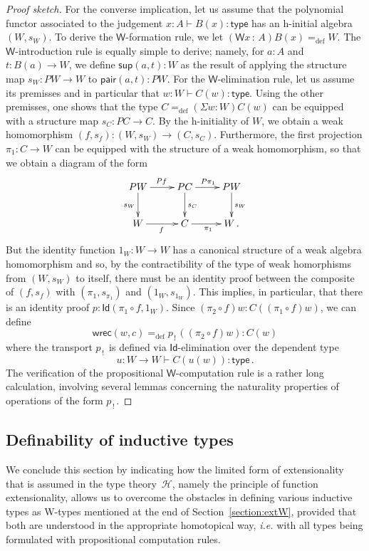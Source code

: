\documentclass{article}
\newcommand{\defeq}{=_{\mathrm{def}}}
\newcommand{\type}{\mathsf{type}}
\newcommand{\Id}{\mathsf{Id}}
\newcommand{\W}{\mathsf{W}}
\newcommand{\wsup}{\mathsf{sup}}
\newcommand{\wrec}{\mathsf{wrec}}
\newcommand{\pair}{\mathsf{pair}}
\newcommand{\Hint}{\mathcal{H}}
\theoremstyle{remark}
\theoremstyle{definition}
\begin{document}
\begin{proof}[Proof sketch]
For the converse implication, let us assume that the polynomial functor associated
to the judgement $x : A \vdash B(x) : \type$ 
has an h-initial algebra $(W,s_W)$. To derive the $\W$-formation rule, we 
let  $(\W x {\, : \, } A) B(x) \defeq W$. The $\W$-introduction rule is equally simple to
derive; namely, for $a : A$ and $t \colon B(a) \rightarrow W$,  we define $\wsup(a,t) : W$ as the 
result of applying the structure map $s_W \colon PW \rightarrow W$ to $\pair(a,t) : PW$.
For the $\W$-elimination rule, let us assume its premisses and in particular that $w : W \vdash C(w) : \type$.
Using the other premisses, one shows that the type $C \defeq (\Sigma w : W) C(w)$
can be equipped with a structure map $s_C : PC \rightarrow C$. By the h-initiality of $W$,
we obtain a weak homomorphism $(f, s_f) : (W, s_W) \rightarrow (C, s_C)$. Furthermore,
the first projection $\pi_1 : C \rightarrow W$ can be equipped with the structure of a weak 
homomorphism, so that we obtain a diagram of the form
\[
\xymatrix{
PW \ar[r]^{Pf} \ar[d]_{s_W}  & PC \ar[d]^{s_C}  \ar[r]^{P \pi_1}  & PW  \ar[d]^{s_W}  \\
W \ar[r]_f  & C \ar[r]_{\pi_1}  & W \, .}
\]
But the identity function $1_W : W \rightarrow W$ has a canonical structure of a weak
algebra homomorphism and so, by the contractibility of the type of weak homorphisms
from $(W,s_W)$ to itself, there must be an identity proof between the composite
of $(f,s_f)$ with $(\pi_1, s_{\pi_1})$ and $(1_W, s_{1_W})$. This implies, in particular,
that there is an identity proof $p : \Id( \pi_1 \circ f, 1_W)$. 
Since $(\pi_2 \circ f) w : C( (\pi_1 \circ f) w)$, we can define
\[
\wrec(w,c) \defeq
p_{\, ! \,}( ( \pi_2 \circ  f)   w )   : C(w) 
\]
where the transport $p_{\, ! \,}$ is defined via $\Id$-elimination over the dependent type
\[
u : W \rightarrow W \vdash C ( u (w)) : \type \, .
\]
The verification of the propositional $\W$-computation rule is a rather long calculation,
involving several lemmas concerning the naturality properties of operations of the form $p_{\, ! \,}$.
\end{proof}

\subsection{Definability of inductive types}\label{subsec:define}

\noindent We conclude this section by indicating how the limited form of extensionality that is assumed in the type theory~$\Hint$, namely the principle of function extensionality, allows us to overcome the obstacles in defining various inductive types as W-types mentioned at the end of Section~\ref{section:extW}, provided that both are understood in the appropriate homotopical way, \emph{i.e.} with all types being formulated with propositional computation rules. 
\end{document}
